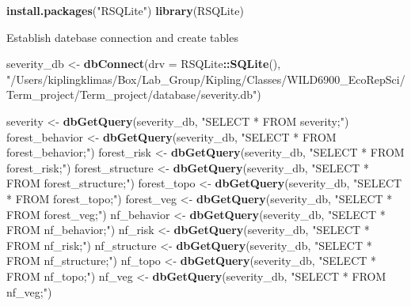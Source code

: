 \documentclass[]{book}
\newenvironment{Shaded}{\begin{snugshade}}{\end{snugshade}}
\newcommand{\DataTypeTok}[1]{\textcolor[rgb]{0.13,0.29,0.53}{#1}}
\newcommand{\KeywordTok}[1]{\textcolor[rgb]{0.13,0.29,0.53}{\textbf{#1}}}
\newcommand{\NormalTok}[1]{#1}
\newcommand{\OperatorTok}[1]{\textcolor[rgb]{0.81,0.36,0.00}{\textbf{#1}}}
\newcommand{\StringTok}[1]{\textcolor[rgb]{0.31,0.60,0.02}{#1}}
\begin{document}
\begin{Shaded}
\begin{Highlighting}[]
\KeywordTok{install.packages}\NormalTok{(}\StringTok{"RSQLite"}\NormalTok{)}
\KeywordTok{library}\NormalTok{(RSQLite)}
\end{Highlighting}
\end{Shaded}

Establish datebase connection and create tables

\begin{Shaded}
\begin{Highlighting}[]
\NormalTok{severity_db <-}\StringTok{ }\KeywordTok{dbConnect}\NormalTok{(}\DataTypeTok{drv =}\NormalTok{ RSQLite}\OperatorTok{::}\KeywordTok{SQLite}\NormalTok{(),}
                \StringTok{"/Users/kiplingklimas/Box/Lab_Group/Kipling/Classes/WILD6900_EcoRepSci/Term_project/Term_project/database/severity.db"}\NormalTok{)}

\NormalTok{severity <-}\StringTok{ }\KeywordTok{dbGetQuery}\NormalTok{(severity_db, }\StringTok{"SELECT * FROM severity;"}\NormalTok{)}
\NormalTok{forest_behavior <-}\StringTok{ }\KeywordTok{dbGetQuery}\NormalTok{(severity_db, }\StringTok{"SELECT * FROM forest_behavior;"}\NormalTok{)}
\NormalTok{forest_risk <-}\StringTok{ }\KeywordTok{dbGetQuery}\NormalTok{(severity_db, }\StringTok{"SELECT * FROM forest_risk;"}\NormalTok{)}
\NormalTok{forest_structure <-}\StringTok{ }\KeywordTok{dbGetQuery}\NormalTok{(severity_db, }\StringTok{"SELECT * FROM forest_structure;"}\NormalTok{)}
\NormalTok{forest_topo <-}\StringTok{ }\KeywordTok{dbGetQuery}\NormalTok{(severity_db, }\StringTok{"SELECT * FROM forest_topo;"}\NormalTok{)}
\NormalTok{forest_veg <-}\StringTok{ }\KeywordTok{dbGetQuery}\NormalTok{(severity_db, }\StringTok{"SELECT * FROM forest_veg;"}\NormalTok{)}
\NormalTok{nf_behavior <-}\StringTok{ }\KeywordTok{dbGetQuery}\NormalTok{(severity_db, }\StringTok{"SELECT * FROM nf_behavior;"}\NormalTok{)}
\NormalTok{nf_risk <-}\StringTok{ }\KeywordTok{dbGetQuery}\NormalTok{(severity_db, }\StringTok{"SELECT * FROM nf_risk;"}\NormalTok{)}
\NormalTok{nf_structure <-}\StringTok{ }\KeywordTok{dbGetQuery}\NormalTok{(severity_db, }\StringTok{"SELECT * FROM nf_structure;"}\NormalTok{)}
\NormalTok{nf_topo <-}\StringTok{ }\KeywordTok{dbGetQuery}\NormalTok{(severity_db, }\StringTok{"SELECT * FROM nf_topo;"}\NormalTok{)}
\NormalTok{nf_veg <-}\StringTok{ }\KeywordTok{dbGetQuery}\NormalTok{(severity_db, }\StringTok{"SELECT * FROM nf_veg;"}\NormalTok{)}
\end{Highlighting}
\end{Shaded}
\end{document}
